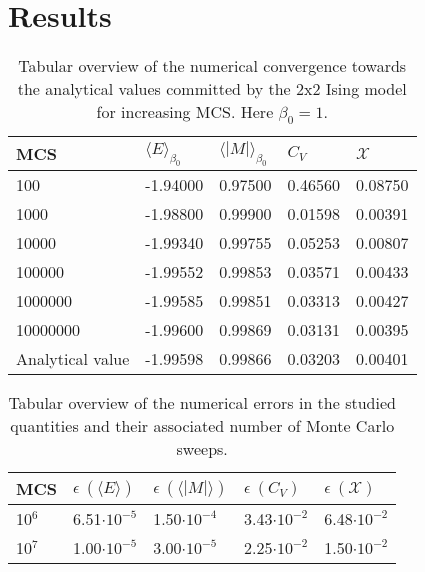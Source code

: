 \section{Results}
\begin{table}[H]
    \centering
    \caption{Tabular overview of the numerical convergence towards the analytical values committed by the 2x2 Ising model for increasing MCS. Here $\beta_0 = 1$.}
    \begin{tabular}{l|l|l|l|l}
    \hline
         MCS & $\langle E \rangle _{\beta_0}$ & $\langle |M| \rangle _{\beta_0}$ & $C_V$ & $\mathcal{X}$\\
         \hline
         100 & -1.94000 & 0.97500& 0.46560 & 0.08750 \\
         1000 & -1.98800&  0.99900& 0.01598 & 0.00391 \\
         10000 & -1.99340&  0.99755 & 0.05253 & 0.00807 \\
         100000 & -1.99552&  0.99853& 0.03571 & 0.00433 \\
         1000000 & -1.99585&  0.99851& 0.03313 & 0.00427\\
         10000000 & -1.99600&  0.99869&  0.03131 & 0.00395\\
         \hline
         Analytical value &-1.99598 & 0.99866 & 0.03203 & 0.00401\\
         \hline
    \end{tabular}
    
    \label{tab:2x2compare}
\end{table}

\begin{table}[H]
    \centering
    \caption{Tabular overview of the numerical errors in the studied quantities and their associated number of Monte Carlo sweeps.}
    \begin{tabular}{l|l|l|l|l}
    \hline
    MCS & $\epsilon\ (\langle E \rangle)$ & $\epsilon\ (\langle |M|\rangle)$ & $\epsilon\ (C_V)$ & $\epsilon\ (\mathcal{X})$\\
    \hline
         10$^6$ & 6.51$\cdot 10^{-5}$ & 1.50$\cdot10^{-4}$ & 3.43$\cdot10^{-2}$ & 6.48$\cdot10^{-2}$  \\
         10$^7$ & 1.00$\cdot10^{-5}$ & 3.00$\cdot10^{-5}$ & 2.25$\cdot10^{-2}$ & 1.50$\cdot10^{-2}$  
    \end{tabular}
    
    \label{tab:my_label}
\end{table}

